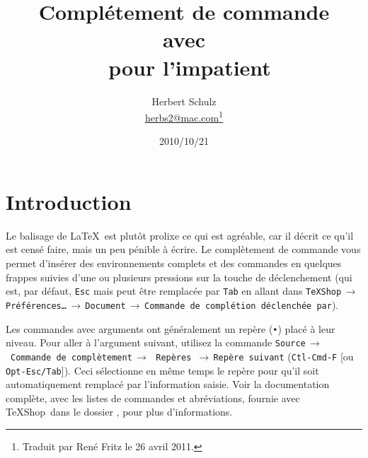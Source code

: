 \documentclass[11pt,french]{article}
\title{Complétement de commande\\ avec \TS\\\ pour l'impatient}
\author{Herbert Schulz\\\small\href{mailto:herbs2@mac.com}{herbs2@mac.com}\thanks{Traduit par René Fritz le 26 avril 2011.}}
\date{2010/10/21}
\newcommand{\mnu}[1]{\texttt{#1}}
\newcommand{\cmd}[1]{\texttt{#1}}
\newcommand{\To}{\,\(\to\)\,}
\newcommand{\TS}{\textsf{\TeX Shop}}
\begin{document}
\maketitle
\thispagestyle{empty}

\section*{Introduction}


Le balisage de \LaTeX\ est plutôt prolixe ce qui est agréable, car il décrit ce qu'il est censé faire, mais un peu pénible à écrire. Le complètement de commande vous permet d'insérer des environnements complets et des commandes en quelques frappes suivies d'une ou plusieurs pressions  sur la touche de déclenchement (qui est, par défaut, \cmd{Esc} mais peut être remplacée par \cmd{Tab} en allant dans \mnu{TeXShop}\To\mnu{Préférences…}\To\mnu{Document}\To\mnu{Commande de complétion déclenchée par}).

Les commandes avec arguments ont généralement un repère (\texttt{•}) placé à leur niveau. Pour aller à l'argument suivant, utilisez la commande \mnu{Source}\To\ \mnu{Commande de complètement}\To\ \mnu{Repères} \To\mnu{Repère suivant} (\cmd{Ctl-Cmd-F} [ou \cmd{Opt-Esc/Tab}]). Ceci sélectionne en même temps le repère pour qu'il soit automatiquement remplacé par l'information saisie. Voir la documentation complète, avec les listes de commandes et abréviations, fournie avec \TS\ dans le dossier , pour plus d'informations.

%
\end{document}
